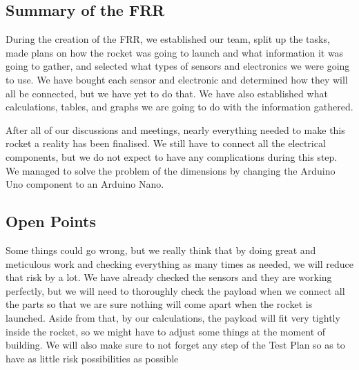 \subsection{Summary of the FRR}

During the creation of the FRR, we established our team, split up the tasks, made plans on how the rocket was going to launch and what information it was going to gather, and selected what types of sensors and electronics we were going to use. We have bought each sensor and electronic and determined how they will all be connected, but we have yet to do that. We have also established what calculations, tables, and graphs we are going to do with the information gathered.

After all of our discussions and meetings, nearly everything needed to make this rocket a reality has been finalised. We still have to connect all the electrical components, but we do not expect to have any complications during this step. We managed to solve the problem of the dimensions by changing the Arduino Uno component to an Arduino Nano. 

\subsection{Open Points}

Some things could go wrong, but we really think that by doing great and meticulous work and checking everything as many times as needed, we will reduce that risk by a lot. We have already checked the sensors and they are working perfectly, but we will need to thoroughly check the payload when we connect all the parts so that we are sure nothing will come apart when the rocket is launched. Aside from that, by our calculations, the payload will fit very tightly inside the rocket, so we might have to adjust some things at the moment of building. We will also make sure to not forget any step of the Test Plan so as to have as little risk possibilities as possible
